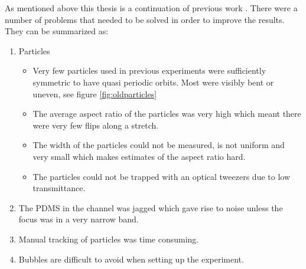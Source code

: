 As mentioned above this thesis is a continuation of previous work \cite{AntonThesis, JonasExperiment, Mishra}. There were a number of problems that needed to be solved in order to improve the results. They can be summarized as:
\begin{enumerate} \label{list:problems}
	\item Particles 
	\begin{itemize}
		\item Very few particles used in previous experiments were sufficiently symmetric to have quasi periodic orbits. Most were visibly bent or uneven, see figure \ref{fig:oldparticles}
		\item The average aspect ratio of the particles was very high which meant there were very few flips along a stretch.
		\item The width of the particles could not be measured, is not uniform and very small which makes estimates of the aspect ratio hard.
		\item The particles could not be trapped with an optical tweezers due to low transmittance.
	\end{itemize}
	\item The PDMS in the channel was jagged which gave rise to noise unless the focus was in a very narrow band.
	\item Manual tracking of particles was time consuming.
	\item Bubbles are difficult to avoid when setting up the experiment.
\end{enumerate}

